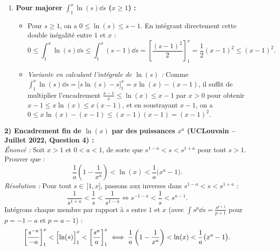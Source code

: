 \begin{exemple}
\begin{enumerate}[label=(\alph*)]
\begin{itemize}
        \item \emph{Méthode 2 (par changement de variable $y = \frac{1}{x} \ge 1$) :} Si $0 < x \le 1$, alors $y = \frac{1}{x} \ge 1$. Appliquons le résultat de (a) à $y \ge 1$ :
        \[
            1 - \frac{1}{y} \le \ln(y) \le y - 1 \iff 1 - x \le -\ln(x) \le \frac{1}{x} - 1 \iff 1 - \frac{1}{x} \le \ln(x) \le x - 1.
        \]
    \end{itemize}
    \item \textbf{Pour majorer $\int_1^x \ln(s)\dd s$ ($x \ge 1$) :}
    \begin{itemize}
        \item Pour $s \ge 1$, on a $0 \le \ln(s) \le s - 1$. En intégrant directement cette double inégalité entre $1$ et $x$ :
        \[
            0 \le \int_1^x \ln(s)\dd s \le \int_1^x (s - 1)\dd s = \left[\frac{(s-1)^2}{2}\right]_1^x = \frac{1}{2}(x - 1)^2 \le (x - 1)^2.
        \]
        \item \emph{Variante en calculant l'intégrale de $\ln(s)$ :} Comme $\int_1^x \ln(s)\dd s = \bigl[s\ln(s) - s\bigr]_1^x = x\ln(x) - (x - 1)$, il suffit de multiplier l'encadrement $\frac{x-1}{x} \le \ln(x) \le x - 1$ par $x > 0$ pour obtenir $x - 1 \le x\ln(x) \le x(x-1)$, et en soustrayant $x - 1$, on a $0 \le x\ln(x) - (x-1) \le (x-1)(x-1) = (x-1)^2$.
    \end{itemize}
\end{enumerate}

\medskip
\textbf{2) Encadrement fin de $\ln(x)$ par des puissances $x^a$ (UCLouvain -- Juillet 2022, Question 4) :}\\
\emph{Énoncé :} Soit $x > 1$ et $0 < a < 1$, de sorte que $s^{1-a} < s < s^{1+a}$ pour tout $s > 1$. Prouver que :
\[
    \frac{1}{a}\left(1 - \frac{1}{x^a}\right) < \ln(x) < \frac{1}{a}\bigl(x^a - 1\bigr).
\]
\emph{Résolution :} Pour tout $s \in \,]1, x]$, passons aux inverses dans $s^{1-a} < s < s^{1+a}$ :
\[
    \frac{1}{s^{1+a}} < \frac{1}{s} < \frac{1}{s^{1-a}} \iff s^{-1-a} < \frac{1}{s} < s^{a-1}.
\]
Intégrons chaque membre par rapport à $s$ entre $1$ et $x$ (avec $\int s^p\dd s = \frac{s^{p+1}}{p+1}$ pour $p = -1-a$ et $p = a-1$) :
\[
    \left[\frac{s^{-a}}{-a}\right]_1^x < \Bigl[\ln(s)\Bigr]_1^x < \left[\frac{s^a}{a}\right]_1^x \iff \frac{1}{a}\left(1 - \frac{1}{x^a}\right) < \ln(x) < \frac{1}{a}\bigl(x^a - 1\bigr).
\]


\end{exemple}
